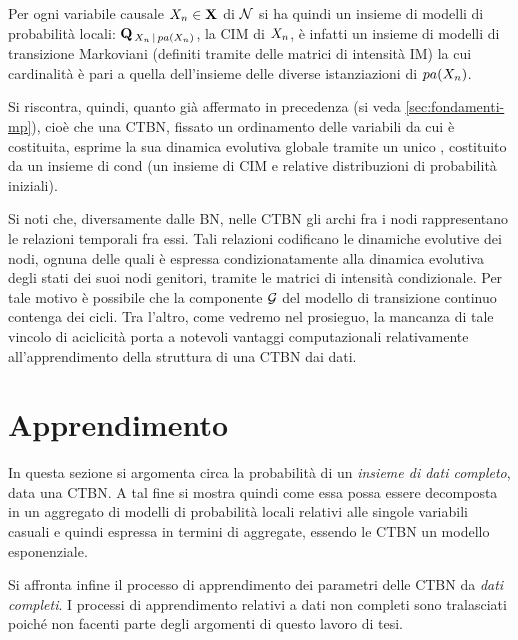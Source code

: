 Per ogni variabile causale $\mathnormal{X_n} \in \mathbf{X}$ di $\mathcal{N}$ si ha quindi un insieme di modelli di probabilità locali: $\mathbf{Q}_{\,\mathnormal{X_n}\,\arrowvert\,pa(\mathnormal{X_n})}$, la \acs{CIM} di $\mathnormal{X_n}$, è infatti un insieme di modelli di transizione Markoviani (definiti tramite delle matrici di intensità \acs{IM}) la cui cardinalità è pari a quella dell'insieme delle diverse istanziazioni di $pa(\mathnormal{X_n})$.

Si riscontra, quindi, quanto già affermato in precedenza (si veda \ref{sec:fondamenti-mp}), cioè che una \acs{CTBN}, fissato un ordinamento delle variabili da cui è costituita, esprime la sua dinamica evolutiva globale tramite un unico \mprocess{} \omog, costituito da un insieme di \mprocess{}cond{} (un insieme di \acs{CIM} e relative distribuzioni di probabilità iniziali).

Si noti che, diversamente dalle \acl{BN}, nelle \acl{CTBN} gli archi fra i nodi rappresentano le relazioni temporali fra essi. Tali relazioni codificano le dinamiche evolutive dei nodi, ognuna delle quali è espressa condizionatamente alla dinamica evolutiva degli stati dei suoi nodi genitori, tramite le matrici di intensità condizionale. Per tale motivo è possibile che la componente $\mathcal{G}$ del modello di transizione continuo contenga dei cicli. Tra l'altro, come vedremo nel prosieguo, la mancanza di tale vincolo di aciclicità porta a notevoli vantaggi computazionali relativamente all'apprendimento della struttura di una \acs{CTBN} dai dati.

\section{Apprendimento}
\label{sec:ctbn-apprendimento}
In questa sezione si argomenta circa la probabilità di un \emph{insieme di dati completo}, data una \acl{CTBN}. A tal fine si mostra quindi come essa possa essere decomposta in un aggregato di modelli di probabilità locali relativi alle singole variabili casuali e quindi espressa in termini di \emph{\stats{}} aggregate, essendo le \acs{CTBN} un modello esponenziale.

Si affronta infine il processo di apprendimento dei parametri delle \acl{CTBN} da \emph{dati completi}. I processi di apprendimento relativi a dati non completi sono tralasciati poiché non facenti parte degli argomenti di questo lavoro di tesi.

